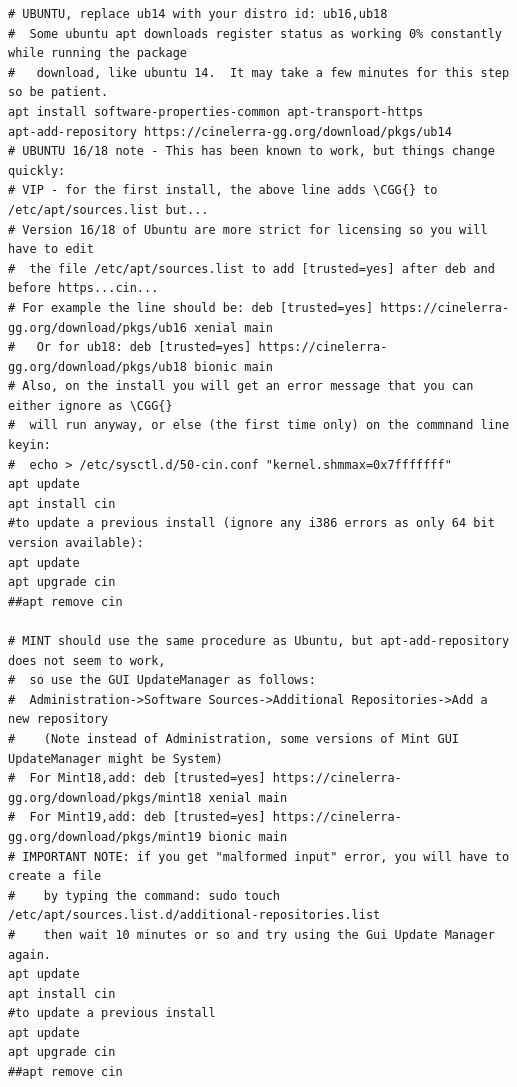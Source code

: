 \begin{lstlisting}[numbers=none]
# UBUNTU, replace ub14 with your distro id: ub16,ub18
#  Some ubuntu apt downloads register status as working 0% constantly while running the package
#   download, like ubuntu 14.  It may take a few minutes for this step so be patient.
apt install software-properties-common apt-transport-https
apt-add-repository https://cinelerra-gg.org/download/pkgs/ub14
# UBUNTU 16/18 note - This has been known to work, but things change quickly:
# VIP - for the first install, the above line adds \CGG{} to /etc/apt/sources.list but...
# Version 16/18 of Ubuntu are more strict for licensing so you will have to edit
#  the file /etc/apt/sources.list to add [trusted=yes] after deb and before https...cin...
# For example the line should be: deb [trusted=yes] https://cinelerra-gg.org/download/pkgs/ub16 xenial main
#   Or for ub18: deb [trusted=yes] https://cinelerra-gg.org/download/pkgs/ub18 bionic main
# Also, on the install you will get an error message that you can either ignore as \CGG{}
#  will run anyway, or else (the first time only) on the commnand line keyin: 
#  echo > /etc/sysctl.d/50-cin.conf "kernel.shmmax=0x7fffffff"
apt update
apt install cin
#to update a previous install (ignore any i386 errors as only 64 bit version available):
apt update
apt upgrade cin
##apt remove cin

# MINT should use the same procedure as Ubuntu, but apt-add-repository does not seem to work,
#  so use the GUI UpdateManager as follows:
#  Administration->Software Sources->Additional Repositories->Add a new repository
#    (Note instead of Administration, some versions of Mint GUI UpdateManager might be System)
#  For Mint18,add: deb [trusted=yes] https://cinelerra-gg.org/download/pkgs/mint18 xenial main
#  For Mint19,add: deb [trusted=yes] https://cinelerra-gg.org/download/pkgs/mint19 bionic main
# IMPORTANT NOTE: if you get "malformed input" error, you will have to create a file
#    by typing the command: sudo touch /etc/apt/sources.list.d/additional-repositories.list
#    then wait 10 minutes or so and try using the Gui Update Manager again.
apt update
apt install cin
#to update a previous install
apt update
apt upgrade cin
##apt remove cin


\end{lstlisting}
